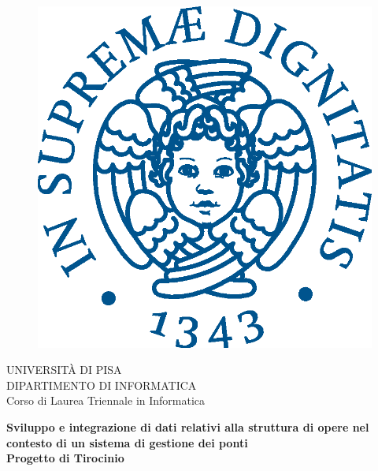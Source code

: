 \begin{titlepage}
    \begin{figure}[!htb]
        \centering
        \includegraphics[keepaspectratio=true,scale=0.5]{chapters/Frontespizio/images/cherubinFrontespizio.eps}
    \end{figure}

    \begin{center}
        \LARGE{UNIVERSITÀ DI PISA}
        \vspace{5mm}
        \\ \large{DIPARTIMENTO DI INFORMATICA }
        \vspace{5mm}
        \\ \LARGE{Corso di Laurea Triennale in Informatica}
    \end{center}

    \vspace{15mm}
    \begin{center}
        {\LARGE{\bf Sviluppo e integrazione di dati relativi alla struttura di opere nel contesto di un sistema di gestione dei ponti\\ \vspace{5mm} Progetto di Tirocinio }}

    \end{center}
    \vspace{30mm}



\end{titlepage}

